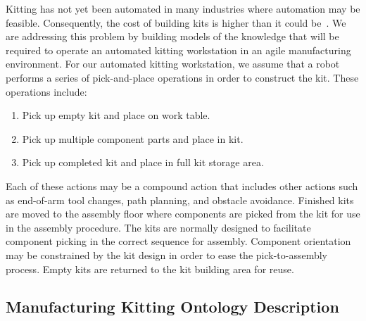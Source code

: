 \documentclass[final,1p,times]{elsarticle}
\begin{document}
Kitting has not yet been automated in many industries where automation may be feasible. Consequently, the cost of building kits is higher than it could be~\cite{Balakirsky.IROS.2012}. We are addressing this problem by building models of the knowledge that will be required to operate an automated kitting workstation in an agile manufacturing environment. For our automated kitting workstation, we assume that a robot performs a series of pick-and-place operations in order to construct the kit. These operations include:
\begin{enumerate}
\item Pick up empty kit and place on work table.
\item Pick up multiple component parts and place in kit.
\item Pick up completed kit and place in full kit storage area.
\end{enumerate}

Each of these actions may be a compound action that includes other actions such as end-of-arm tool changes, path planning, and obstacle avoidance. Finished kits are moved to the assembly floor where components are picked from the kit for use in the assembly procedure. The kits are normally designed to facilitate component picking in the correct sequence for assembly. Component orientation may be constrained by the kit design in order to ease the pick-to-assembly process. Empty kits are returned to the kit building area for reuse.


\subsection{Manufacturing Kitting Ontology Description}
\end{document}

